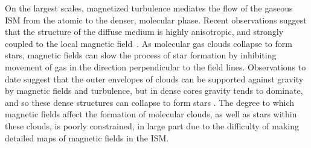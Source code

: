 \documentclass[PICOAPC.tex]{subfiles}
\begin{document}
On the largest scales, magnetized turbulence mediates the flow of the gaseous \ac{ISM} from the atomic to the denser, molecular phase. Recent observations suggest that the structure of the diffuse medium is highly anisotropic, and strongly coupled to the local magnetic field~\citep{Clark:2014, Clark:2015, Kalberla:2016, KalberlaKerp:2016}. As molecular gas clouds collapse to form stars, magnetic fields can slow the process of star formation by inhibiting movement of gas in the direction perpendicular to the field lines. Observations to date suggest that the outer envelopes of clouds can be supported against gravity by magnetic fields and turbulence, but in dense cores gravity tends to dominate, and so these dense structures can collapse to form stars \citep{Crutcher2010}.  The degree to which magnetic fields affect the formation of molecular clouds, as well as stars within these clouds, is poorly constrained, in large part due to the difficulty of making detailed maps of magnetic fields in the ISM.


\end{document}
